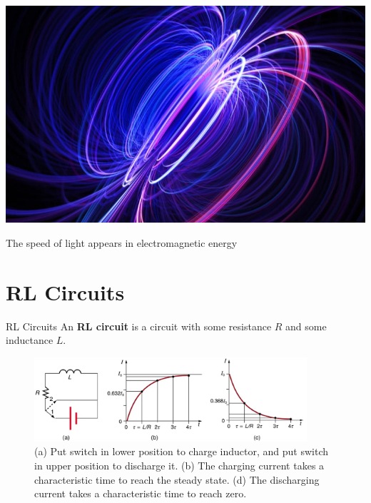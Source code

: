 \documentclass{beamer}
\begin{document}
{
{
    \includegraphics[width=\paperwidth,height=\paperheight]{figures/clue.png}
}
\begin{frame}{The speed of light appears in electromagnetic energy}
\end{frame}
}

\section{RL Circuits}

\begin{frame}{RL Circuits}
An \textbf{\alert{RL circuit}} is a circuit with some resistance $R$ and some inductance $L$.
\begin{figure}
\centering
\includegraphics[width=0.9\textwidth]{figures/RL_circuit.png}
\caption{\label{fig:RL} (a) Put switch in lower position to charge inductor, and put switch in upper position to discharge it. (b) The charging current takes a characteristic time to reach the steady state.  (d) The discharging current takes a characteristic time to reach zero.}
\end{figure}
\end{frame}
\end{document}
